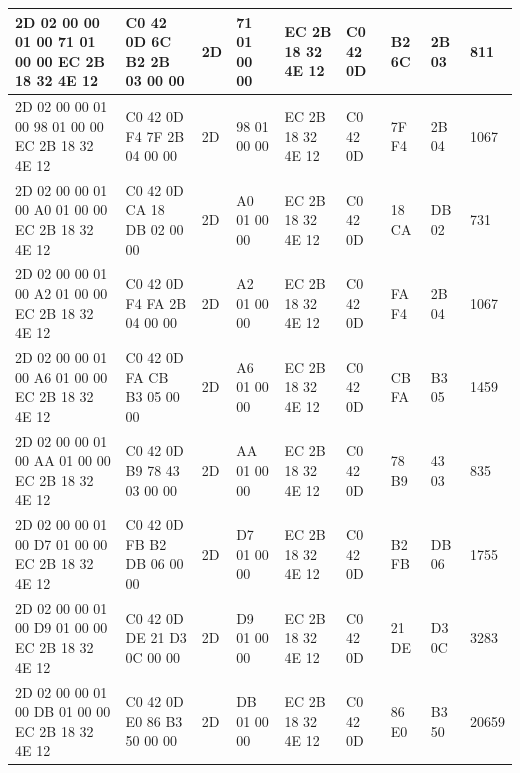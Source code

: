 \documentclass[a4paper,11pt,dvips]{article}
\begin{document}
\begin{landscape}
\begin{table}[htb]
\begin{tabular}{l | l | l | l | l | l | l | l | l}
			2D 02 00 00 01 00 71 01 00 00 EC 2B 18 32 4E 12 & C0 42 0D 6C B2 2B 03 00 00 & 2D & 71 01 00 00 & EC 2B 18 32 4E 12 & C0 42 0D & B2 6C & 2B 03 & 811 \\ \hline
			2D 02 00 00 01 00 98 01 00 00 EC 2B 18 32 4E 12 & C0 42 0D F4 7F 2B 04 00 00 & 2D & 98 01 00 00 & EC 2B 18 32 4E 12 & C0 42 0D & 7F F4 & 2B 04 & 1067 \\ \hline
			2D 02 00 00 01 00 A0 01 00 00 EC 2B 18 32 4E 12 & C0 42 0D CA 18 DB 02 00 00 & 2D & A0 01 00 00 & EC 2B 18 32 4E 12 & C0 42 0D & 18 CA & DB 02 & 731 \\ \hline
			2D 02 00 00 01 00 A2 01 00 00 EC 2B 18 32 4E 12 & C0 42 0D F4 FA 2B 04 00 00 & 2D & A2 01 00 00 & EC 2B 18 32 4E 12 & C0 42 0D & FA F4 & 2B 04 & 1067 \\ \hline
			2D 02 00 00 01 00 A6 01 00 00 EC 2B 18 32 4E 12 & C0 42 0D FA CB B3 05 00 00 & 2D & A6 01 00 00 & EC 2B 18 32 4E 12 & C0 42 0D & CB FA & B3 05 & 1459 \\ \hline
			2D 02 00 00 01 00 AA 01 00 00 EC 2B 18 32 4E 12 & C0 42 0D B9 78 43 03 00 00 & 2D & AA 01 00 00 & EC 2B 18 32 4E 12 & C0 42 0D & 78 B9 & 43 03 & 835 \\ \hline
			2D 02 00 00 01 00 D7 01 00 00 EC 2B 18 32 4E 12 & C0 42 0D FB B2 DB 06 00 00 & 2D & D7 01 00 00 & EC 2B 18 32 4E 12 & C0 42 0D & B2 FB & DB 06 & 1755 \\ \hline
			2D 02 00 00 01 00 D9 01 00 00 EC 2B 18 32 4E 12 & C0 42 0D DE 21 D3 0C 00 00 & 2D & D9 01 00 00 & EC 2B 18 32 4E 12 & C0 42 0D & 21 DE & D3 0C & 3283 \\ \hline
			2D 02 00 00 01 00 DB 01 00 00 EC 2B 18 32 4E 12 & C0 42 0D E0 86 B3 50 00 00 & 2D & DB 01 00 00 & EC 2B 18 32 4E 12 & C0 42 0D & 86 E0 & B3 50 & 20659 \\ \hline
			
		\end{tabular}
\end{table}
\end{landscape}
\end{document}
